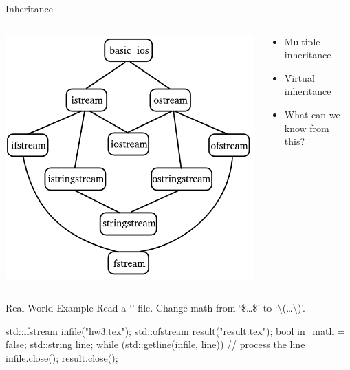 \begin{frame}{Inheritance}
    \begin{columns}
        \begin{column}{0.6\textwidth}
            \begin{center}
                \includegraphics[scale=0.425]{figures/iostream_inheritance.png}
            \end{center}
        \end{column}
        \begin{column}{0.4\textwidth}
            \begin{itemize}
                \item Multiple inheritance
                \item Virtual inheritance
                \item What can we know from this?
            \end{itemize}
        \end{column}
    \end{columns}
\end{frame}

\begin{frame}[fragile]{Real World Example}
    Read a `' file. Change math from `\$\dots\$' to `\textbackslash(\dots\textbackslash)'.
    \begin{cpp}
std::ifstream infile("hw3.tex");
std::ofstream result("result.tex");
bool in_math = false;
std::string line;
while (std::getline(infile, line)) {
  // process the line
}
infile.close();
result.close();
    \end{cpp}
\end{frame}

